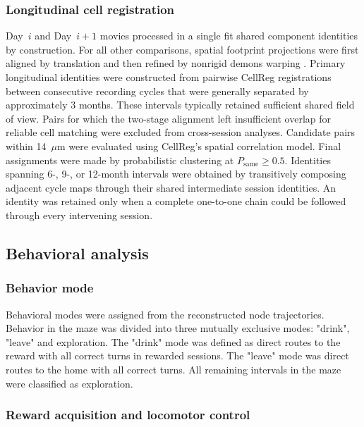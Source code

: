 \documentclass[fleqn,10pt]{wlscirep}
\begin{document}
\subsubsection*{Longitudinal cell registration}

Day~$i$ and Day~$i+1$ movies processed in a single fit shared component identities by construction. For all other comparisons, spatial footprint projections were first aligned by translation and then refined by nonrigid demons warping \cite{thirion_image_1998}. Primary longitudinal identities were constructed from pairwise CellReg registrations \cite{sheintuch_tracking_2017} between consecutive recording cycles that were generally separated by approximately 3 months. These intervals typically retained sufficient shared field of view. Pairs for which the two-stage alignment left insufficient overlap for reliable cell matching were excluded from cross-session analyses. Candidate pairs within 14~$\mu$m were evaluated using CellReg's spatial correlation model. Final assignments were made by probabilistic clustering at $P_{\mathrm{same}} \geq 0.5$. Identities spanning 6-, 9-, or 12-month intervals were obtained by transitively composing adjacent cycle maps through their shared intermediate session identities. An identity was retained only when a complete one-to-one chain could be followed through every intervening session. 

\subsection*{Behavioral analysis}

\subsubsection*{Behavior mode}

Behavioral modes were assigned from the reconstructed node trajectories. Behavior in the maze was divided into three mutually exclusive modes: "drink", "leave" and exploration. The "drink" mode was defined as direct routes to the reward with all correct turns in rewarded sessions. The "leave" mode was direct routes to the home with all correct turns. All remaining intervals in the maze were classified as exploration. 

\subsubsection*{Reward acquisition and locomotor control}
\end{document}
